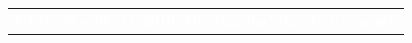 \documentclass{article}
\begin{document}
{\begin{minipage}{11.6cm}
		\bigskip 

		\hspace{-1.2em}
		\renewcommand{\arraystretch}{3.00}
		\begin{tabular}{p{7.5cm}p{3.1cm}}
			\cellcolor{Black}      
			\textcolor{white}{{\textbf{\normalsize UFU, 03 a 05/11/2016, Uberlândia-MG}}}  & 
			\cellcolor{lightpastelpurple}  
			\textcolor{white}{{\textbf{\Large Participante}}} 
			\\
		\end{tabular}
	\end{minipage}
}
\end{document}

